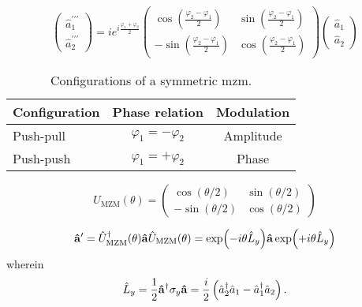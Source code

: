 \begin{equation}
	\begin{pmatrix}
		\hat{a}_1^{\prime\prime\prime} \\
		\hat{a}_2^{\prime\prime\prime}
	\end{pmatrix}
	=
	ie^{i\frac{\varphi_1+\varphi_2}{2}}
	\begin{pmatrix}
		\cos(\frac{\varphi_2-\varphi_1}{2}) & \sin(\frac{\varphi_2-\varphi_1}{2}) \\
		-\sin(\frac{\varphi_2-\varphi_1}{2}) & \cos(\frac{\varphi_2-\varphi_1}{2})
	\end{pmatrix}
	\begin{pmatrix}
		\hat{a}_1 \\
		\hat{a}_2
	\end{pmatrix}
\end{equation}

\begin{table}[htb]
	\centering
	\begin{tabular}{lcc}
		\toprule
		Configuration & Phase relation & Modulation \\
		\midrule
		Push-pull & $\varphi_1=-\varphi_2$ & Amplitude \\
		Push-push & $\varphi_1=+\varphi_2$ & Phase \\
		\bottomrule
	\end{tabular}
	\caption{Configurations of a symmetric \gls{mzm}.}
\end{table}

\begin{equation}
	U_\text{MZM}(\theta)
	=
	\begin{pmatrix}
		\cos(\theta/2) & \sin(\theta/2) \\
		-\sin(\theta/2) & \cos(\theta/2)
	\end{pmatrix}
\end{equation}

\begin{equation}
	\vb{\hat{a}}^\prime
	=
	\hat{U}_\text{MZM}^\dagger(\theta)
	\vb{\hat{a}}
	\hat{U}_\text{MZM}(\theta)
	=
	\exp(-i\theta\hat{L}_y)
	\vb{\hat{a}}
	\exp(+i\theta\hat{L}_y)	
\end{equation}
wherein~\cite[p.~97]{Leonhardt2010}
\begin{equation}
	\hat{L}_y
	=
	\frac{1}{2}
	\vb{\hat{a}}^\dagger
	\sigma_y
	\vb{\hat{a}}
	=
	\frac{i}{2}
	\left(
		\hat{a}_2^\dagger
		\hat{a}_1
		-
		\hat{a}_1^\dagger
		\hat{a}_2
	\right)
	.
\end{equation}

